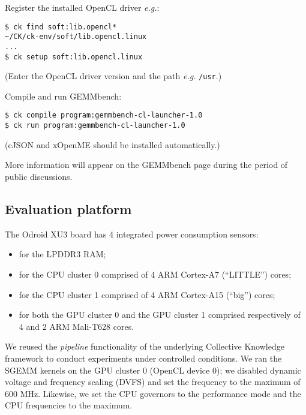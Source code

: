 \documentclass{acm_proc_article-sp} %
\begin{document}
Register the installed OpenCL driver {\em e.g.}:
\begin{verbatim}
$ ck find soft:lib.opencl*
~/CK/ck-env/soft/lib.opencl.linux
...
$ ck setup soft:lib.opencl.linux
\end{verbatim}
(Enter the OpenCL driver version and the path {\em e.g.} \verb|/usr|.)

Compile and run GEMMbench:
\begin{verbatim}
$ ck compile program:gemmbench-cl-launcher-1.0
$ ck run program:gemmbench-cl-launcher-1.0
\end{verbatim}
(cJSON and xOpenME should be installed automatically.)


%
More information will appear on the GEMMbench page during the period of public discussions.

\subsection{Evaluation platform}

The Odroid XU3 board has 4 integrated power consumption sensors:
%
\begin{itemize}

  \item for the LPDDR3 RAM;

  \item for the CPU cluster 0 comprised of 4 ARM Cortex-A7 (``LITTLE'') cores;

  \item for the CPU cluster 1 comprised of 4 ARM Cortex-A15 (``big'') cores;

  \item for both the GPU cluster 0 and the GPU cluster 1 comprised respectively
  of 4 and 2 ARM Mali-T628 cores.

\end{itemize}
%
We reused the {\em pipeline} functionality of the underlying Collective
Knowledge framework to conduct experiments under controlled conditions.
%
We ran the SGEMM kernels on the GPU cluster 0 (OpenCL device 0); we disabled
dynamic voltage and frequency scaling (DVFS) and set the frequency to the
maximum of 600 MHz.
%
Likewise, we set the CPU governors to the performance mode and the CPU
frequencies to the maximum.
%

\end{document}

